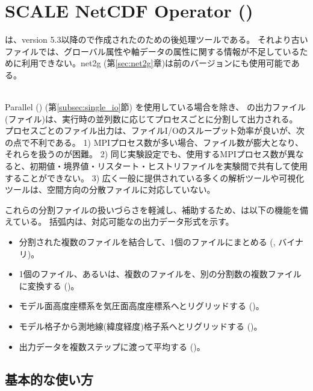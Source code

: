 \section{SCALE NetCDF Operator (\sno)} \label{sec:sno}

 \hrulefill

\sno は、version 5.3以降の\scalelib で作成された\scalenetcdf のための後処理ツールである。
それより古い \scalenetcdf ファイルでは、グローバル属性や軸データの属性に関する情報が不足しているために利用できない。net2g (第\ref{sec:net2g}章)は前のバージョンにも使用可能である。

\hrulefill\\


Parallel \netcdf (\pnetcdf) (第\ref{subsec:single_io}節) を使用している場合を除き、
\scalerm の出力ファイル(\scalenetcdf ファイル)は、実行時の並列数に応じてプロセスごとに分割して出力される。
プロセスごとのファイル出力は、ファイルI/Oのスループット効率が良いが、次の点で不利である。
1) MPIプロセス数が多い場合、ファイル数が膨大となり、それらを扱うのが困難。
2) 同じ実験設定でも、使用するMPIプロセス数が異なると、初期値・境界値・リスタート・ヒストリファイルを実験間で共有して使用することができない。
3) 広く一般に提供されている多くの解析ツールや可視化ツールは、空間方向の分散ファイルに対応していない。

これらの分割ファイルの扱いづらさを軽減し、補助するため、\sno は以下の機能を備えている。
括弧内は、対応可能な\sno の出力データ形式を示す。
\begin{itemize}
 \item 分割された複数のファイルを結合して、1個のファイルにまとめる (\scalenetcdf, \grads バイナリ)。
 \item 1個のファイル、あるいは、複数のファイルを、別の分割数の複数ファイルに変換する (\scalenetcdf)。
 \item モデル面高度座標系を気圧面高度座標系へとリグリッドする (\scalenetcdf)。
 \item モデル格子から測地線(緯度経度)格子系へとリグリッドする (\scalenetcdf)。
 \item 出力データを複数ステップに渡って平均する (\scalenetcdf)。
\end{itemize}


\subsection{基本的な使い方}

